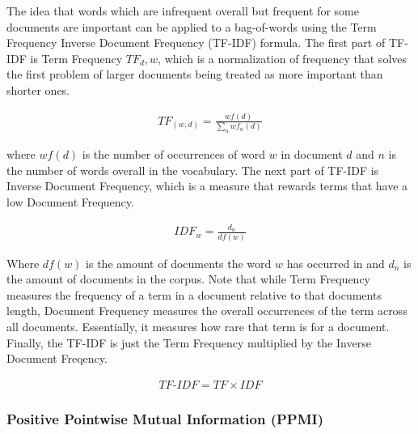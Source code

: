The idea that words which are infrequent overall but frequent for some documents are important can be applied to a bag-of-words using the Term Frequency Inverse Document Frequency (TF-IDF) formula. The first part of TF-IDF is Term Frequency $TF_d,w$, which is a normalization of frequency that solves the first problem of larger documents being treated as more important than shorter ones. 

\begin{align*}
TF_{(w, d)} =  \frac{{wf}(d)}{\sum_{n} {wf}_n(d)} 
\end{align*}

where ${wf}(d)$ is the number of occurrences of word $w$ in document $d$ and $n$ is the number of words overall in the vocabulary.  The next part of TF-IDF is Inverse Document Frequency, which is a measure that rewards terms that have a low Document Frequency. 

\begin{align*}
IDF_{w} =  \frac{d_n}{{df}(w)} 
\end{align*}

Where ${df}(w)$ is the amount of documents the word $w$ has occurred in and $d_n$ is the amount of documents in the corpus. Note that while Term Frequency measures the frequency of a term in a document relative to that documents length, Document Frequency measures the overall occurrences of the term across all documents. Essentially, it measures how rare that term is for a document. Finally, the TF-IDF is just the Term Frequency multiplied by the Inverse Document Freqency.

\begin{align*}
\textit{TF-IDF} = TF \times IDF
\end{align*}


\subsubsection{Positive Pointwise Mutual Information (PPMI)}\label{bg:ppmi}




